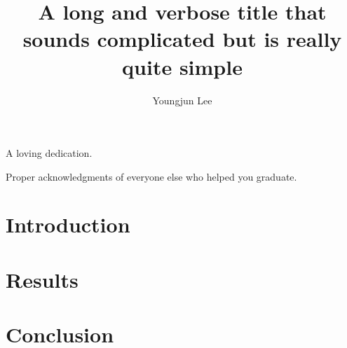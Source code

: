 




\title{A long and verbose title that sounds complicated but is really quite simple}
\author{Youngjun Lee}
\deanlinethree{}

\begin{frontmatter}
\maketitle

\copyrightpage

\tableofcontents

\listoffigures

\listoftables

\begin{abstract}

\end{abstract}

\begin{dedication}
\vspace*{\fill}
\begin{center}
A loving dedication.
\end{center}
\vspace*{\fill}
\end{dedication}

\begin{acknowledgements}
Proper acknowledgments of everyone else who helped you graduate.
\end{acknowledgements}

\end{frontmatter}

\chapter{Introduction}


\chapter{Results}


\chapter{Conclusion}



\nocite{*}

\singlespacing

\doublespacing


